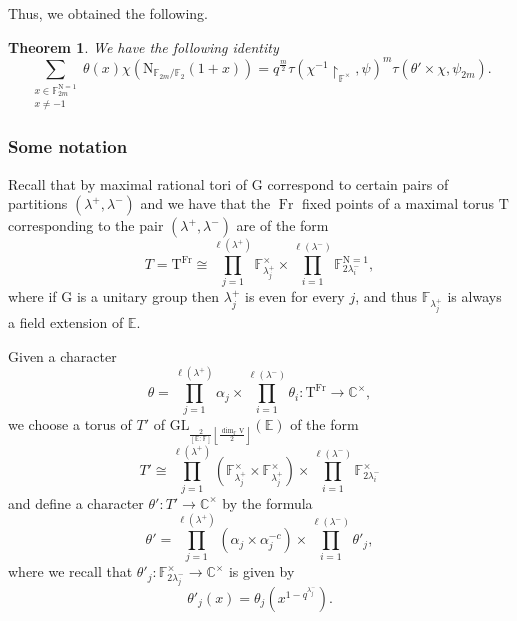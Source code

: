 \documentclass[12pt, reqno]{amsart}
\newtheorem{theorem}{Theorem}[section]
\theoremstyle{definition}
\theoremstyle{definition}
\theoremstyle{definition}
\newcommand{\cComplex}{\mathbb{C}}
\newcommand{\multiplicativegroup}[1]{#1^{\times}}
\newcommand{\lengthof}{\ell}
\newcommand{\hermitianSpace}{\mathrm{V}}
\newcommand{\fieldCharacter}{\psi}
\newcommand{\grpIndex}[2]{\left[#1:#2\right]}
\newcommand{\minusInvolution}[1]{#1^{-c}}
\newcommand{\GL}{\mathrm{GL}}
\newcommand{\aFieldNorm}{\mathrm{N}}
\newcommand{\finiteField}{\mathbb{F}}
\newcommand{\quadraticExtension}{\mathbb{E}}
\newcommand{\finiteFieldExtension}[1]{\finiteField_{#1}}
\newcommand{\NormOneGroup}[1]{\finiteFieldExtension{#1}^{\aFieldNorm = 1}}
\newcommand{\Frobenius}{\operatorname{Fr}}
\newcommand{\GaussSumSingleCharacter}[2]{\tau\left(#1, #2\right)}
\newcommand{\GaussSumCharacter}[3]{\tau\left(#1 \times #2, #3\right)}
\newcommand{\algebraicGroup}[1]{\boldsymbol{\mathrm{#1}}}
\begin{document}
Thus, we obtained the following.
\begin{theorem}
	We have the following identity $$\sum_{\substack{x \in \NormOneGroup{2m}\\
			x \ne -1}} \theta \left(x\right) \chi\left(\aFieldNorm_{\finiteFieldExtension{2m} \slash \finiteFieldExtension{2}}\left(1 + x\right)\right) = q^{\frac{m}{2}} \GaussSumSingleCharacter{\chi^{-1} \restriction_{\multiplicativegroup{\finiteField}}}{\fieldCharacter}^m \GaussSumCharacter{\theta'}{\chi}{\fieldCharacter_{2m}}.$$
\end{theorem}

\subsubsection{Some notation}
Recall that by  maximal rational tori of $\algebraicGroup{G}$ correspond to certain pairs of partitions $\left(\lambda^+, \lambda^-\right)$ and we have that the $\Frobenius$ fixed points of a maximal torus $\algebraicGroup{T}$ corresponding to the pair $\left(\lambda^+, \lambda^-\right)$ are of the form $$T = \algebraicGroup{T}^{\Frobenius} \cong \prod_{j=1}^{\lengthof(\lambda^+)} \multiplicativegroup{\finiteFieldExtension{\lambda_j^{+}}} \times \prod_{i=1}^{\lengthof(\lambda^-)} \NormOneGroup{2 \lambda_i^{-}},$$
where if $\algebraicGroup{G}$ is a unitary group then $\lambda_j^{+}$ is even for every $j$, and thus $\finiteFieldExtension{\lambda^+_j}$ is always a field extension of $\quadraticExtension$.

Given a character $$\theta = \prod_{j=1}^{\lengthof(\lambda^+)} \alpha_j \times \prod_{i=1}^{\lengthof(\lambda^-)} \theta_i \colon \algebraicGroup{T}^{\Frobenius} \to \multiplicativegroup{\cComplex},$$ we choose a torus of $T'$ of $\GL_{\frac{2}{\grpIndex{\quadraticExtension}{\finiteField}} \left\lfloor\frac{\dim_{\finiteField} \hermitianSpace}{2}\right\rfloor}\left(\quadraticExtension\right)$ of the form $$T' \cong \prod_{j=1}^{\lengthof(\lambda^+)} \left(\multiplicativegroup{\finiteFieldExtension{\lambda_j^{+}}} \times \multiplicativegroup{\finiteFieldExtension{\lambda_j^{+}}}\right) \times \prod_{i=1}^{\lengthof(\lambda^-)} \multiplicativegroup{\finiteFieldExtension{2 \lambda_i^{-}}}$$ and define a character $\theta' \colon T' \to \multiplicativegroup{\cComplex}$ by the formula
$$\theta' = \prod_{j=1}^{\lengthof(\lambda^+)} \left(\alpha_j \times \minusInvolution{\alpha}_j\right) \times \prod_{i=1}^{\lengthof(\lambda^-)} \theta'_j,$$
where we recall that $\theta'_j \colon \multiplicativegroup{\finiteFieldExtension{2 \lambda_j^{-}}} \to \multiplicativegroup{\cComplex}$ is given by $$\theta'_j\left(x\right) = \theta_j\left(x^{1-q^{\lambda_j^-}}\right).$$
\end{document}
